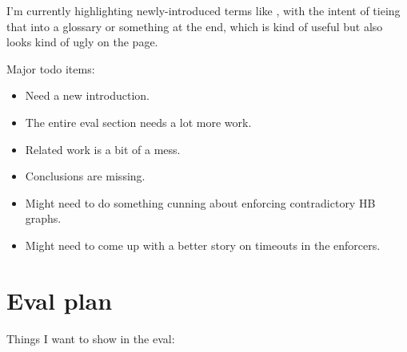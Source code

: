 I'm currently highlighting newly-introduced terms
like , with the intent of tieing that into a
glossary or something at the end, which is kind of useful but also
looks kind of ugly on the page.


Major todo items:

\begin{itemize}
\item Need a new introduction.
\item The entire eval section needs a lot more work.
\item Related work is a bit of a mess.
\item Conclusions are missing.
\item Might need to do something cunning about enforcing contradictory
  HB graphs.
\item Might need to come up with a better story on timeouts in the
  enforcers.
\end{itemize}


\section{Eval plan}

Things I want to show in the eval:

